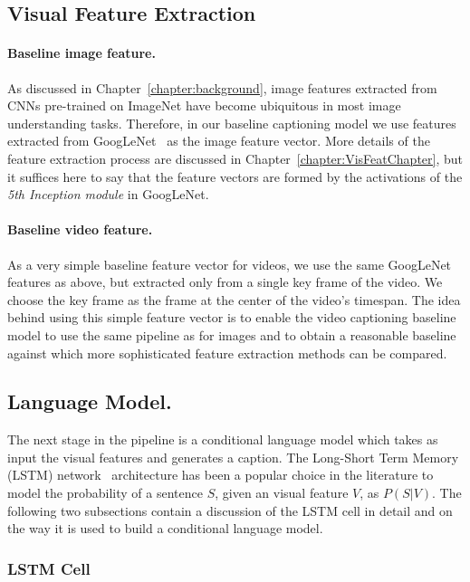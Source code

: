 \subsection{Visual Feature Extraction}

\paragraph{Baseline image feature.} As discussed in
Chapter~\ref{chapter:background}, image features extracted from CNNs pre-trained
on ImageNet have become ubiquitous in most image understanding tasks.
Therefore, in our baseline captioning model we use features extracted from
GoogLeNet~\cite{DBLP:journals/corr/SzegedyLJSRAEVR14} as the image feature
vector.
More details of the feature extraction process are discussed in
Chapter~\ref{chapter:VisFeatChapter}, but it suffices here to say that the feature
vectors are formed by the activations of the \emph{5th Inception module} in
GoogLeNet.

\paragraph{Baseline video feature.} As a very simple baseline feature vector for
videos, we use the same GoogLeNet features as above, but extracted only from a
single key frame of the video.
We choose the key frame as the frame at the center of the video's timespan.
The idea behind using this simple feature vector is to enable the video
captioning baseline model to use the same pipeline as for images and to obtain a
reasonable baseline against which more sophisticated feature extraction methods
can be compared.

\subsection{Language Model.}

The next stage in the pipeline is a conditional language model which
takes as input the visual features and generates a caption.
The Long-Short Term Memory (LSTM) network~\cite{Hochreiter1997} architecture has
been a popular choice in the literature to model the probability of a sentence
$S$, given an visual feature $V$, as $P(S|V)$.
The following two subsections contain a discussion of the LSTM cell in detail
and on the way it is used to build a conditional language model.

\subsubsection{LSTM Cell}

